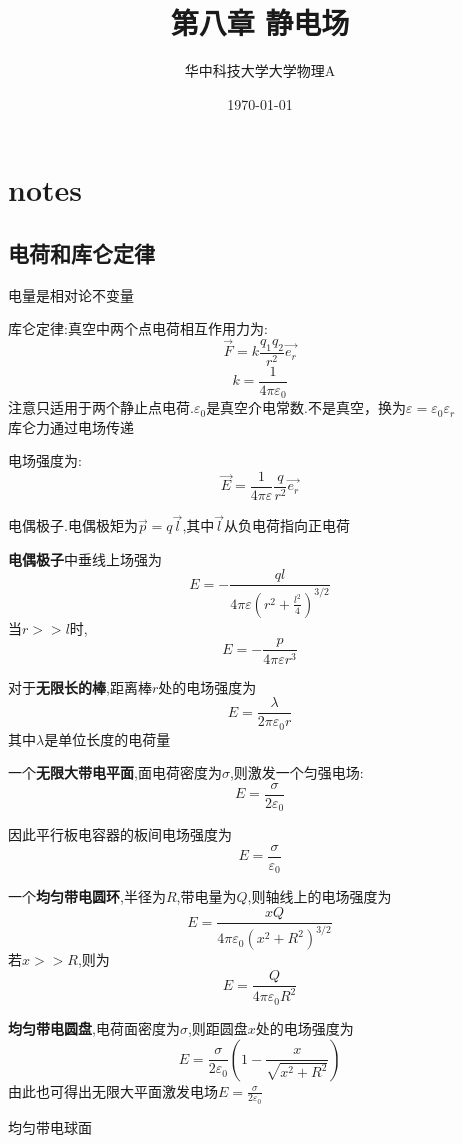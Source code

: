 \documentclass[10pt,a4paper]{article}
\title{第八章 静电场}
\author{华中科技大学大学物理A}
\date{\today}
\begin{document}
\maketitle
\section{notes}
\subsection{电荷和库仑定律}
电量是相对论不变量

库仑定律:真空中两个点电荷相互作用力为:
\[\vec{F}=k\frac{q_1q_2}{r^2}\vec{e_r}\]
\[k=\frac{1}{4\pi\varepsilon_0}\]
注意只适用于两个静止点电荷.$\varepsilon_0$是真空介电常数.不是真空，换为$\varepsilon=\varepsilon_0\varepsilon_r$
\\库仑力通过电场传递

电场强度为:
\[\vec{E}=\frac{1}{4\pi\varepsilon}\frac{q}{r^2}\vec{e_r}\]

电偶极子.电偶极矩为$\vec{p}=q\vec{l}$,其中$\vec{l}$从负电荷指向正电荷

\textbf{电偶极子}中垂线上场强为\[E=-\frac{ql}{4\pi\varepsilon (r^2+\frac{l^2}{4})^{3/2}}\]
当$r>>l$时,
\[E=-\frac{p}{4\pi\varepsilon r^3}\]

对于\textbf{无限长的棒},距离棒$r$处的电场强度为
\[E=\frac{\lambda}{2\pi\varepsilon_0 r}\]其中$\lambda$是单位长度的电荷量

一个\textbf{无限大带电平面},面电荷密度为$\sigma$,则激发一个匀强电场:
\[E=\frac{\sigma}{2\varepsilon_0}\]

因此平行板电容器的板间电场强度为
\[E=\frac{\sigma}{\varepsilon_0}\]

一个\textbf{均匀带电圆环},半径为$R$,带电量为$Q$,则轴线上的电场强度为
\[E=\frac{xQ}{4\pi\varepsilon_0(x^2+R^2)^{3/2}}\]
若$x>>R$,则为\[E=\frac{Q}{4\pi\varepsilon_0R^2}\]

\textbf{均匀带电圆盘},电荷面密度为$\sigma$,则距圆盘$x$处的电场强度为\[E=\frac{\sigma}{2\varepsilon_0}(1-\frac{x}{\sqrt{x^2+R^2}})\]
由此也可得出无限大平面激发电场$E=\frac{\sigma}{2\varepsilon_0}$

均匀带电球面
\end{document}

